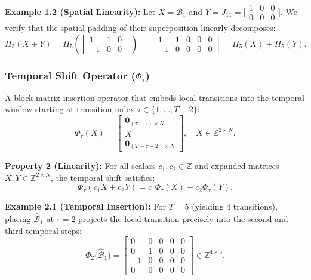 \documentclass[sigconf,review,anonymous]{acmart}
\newcommand{\calB}{\mathcal{B}}
\begin{document}
\noindent\textbf{Example 1.2 (Spatial Linearity):} Let $X = \calB_1$ and $Y = J_{11} = \bigl[\begin{smallmatrix} 1 & 0 & 0 \\ 0 & 0 & 0 \end{smallmatrix}\bigr]$. We verify that the spatial padding of their superposition linearly decomposes:
\begin{equation}
    \Pi_5(X + Y) = \Pi_5\left( \left[\begin{smallmatrix} 1 & 1 & 0 \\ -1 & 0 & 0 \end{smallmatrix}\right] \right) = \left[\begin{smallmatrix} 1 & 1 & 0 & 0 & 0 \\ -1 & 0 & 0 & 0 & 0 \end{smallmatrix}\right] = \Pi_5(X) + \Pi_5(Y).
\end{equation}

\subsubsection{\textbf{Temporal Shift Operator ($\Phi_\tau$)}}
A block matrix insertion operator that embeds local transitions into the temporal window starting at transition index $\tau \in \{1, \ldots, T-2\}$:
\begin{equation}
    \Phi_\tau(X) = \begin{bmatrix} \mathbf{0}_{(\tau-1)\times N} \\ X \\ \mathbf{0}_{(T-\tau-2)\times N} \end{bmatrix}, \quad X \in \mathbb{Z}^{2\times N}.
\end{equation}

\noindent\textbf{Property 2 (Linearity):} For all scalars $c_1, c_2 \in \mathbb{Z}$ and expanded matrices $X, Y \in \mathbb{Z}^{2\times N}$, the temporal shift satisfies:
\begin{equation}
    \Phi_\tau(c_1 X + c_2 Y) = c_1\Phi_\tau(X) + c_2\Phi_\tau(Y).
\end{equation}

\noindent\textbf{Example 2.1 (Temporal Insertion):} For $T=5$ (yielding 4 transitions), placing $\hat{\calB}_1$ at $\tau = 2$ projects the local transition precisely into the second and third temporal steps:
\begin{equation}
    \Phi_2\bigl(\hat{\calB}_1\bigr) =
    \left[\begin{smallmatrix}
         0 & 0 & 0 & 0 & 0 \\
         0 & 1 & 0 & 0 & 0 \\
        -1 & 0 & 0 & 0 & 0 \\
         0 & 0 & 0 & 0 & 0
    \end{smallmatrix}\right] \in \mathbb{Z}^{4 \times 5}.
\end{equation}
\end{document}
